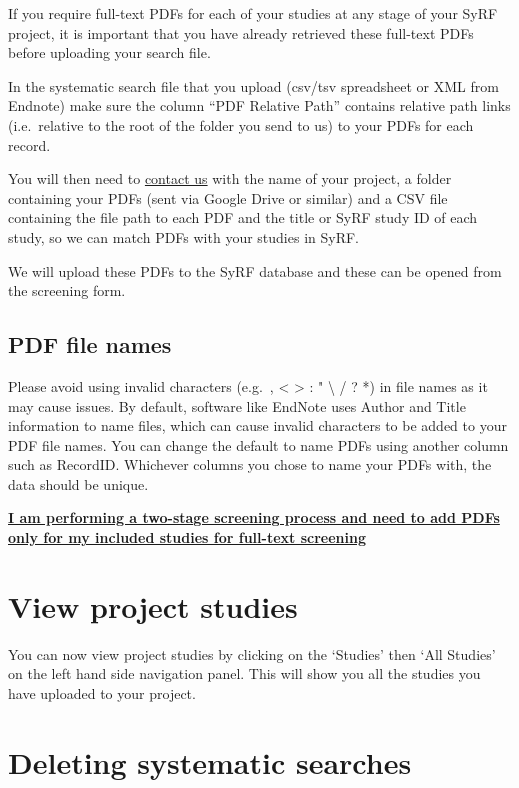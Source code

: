\documentclass[
]{book}
\begin{document}
If you require full-text PDFs for each of your studies at any stage of your SyRF project, it is important that you have already retrieved these full-text PDFs before uploading your search file.

In the systematic search file that you upload (csv/tsv spreadsheet or XML from Endnote) make sure the column ``PDF Relative Path'' contains relative path links (i.e.~relative to the root of the folder you send to us) to your PDFs for each record.

You will then need to \href{syrf.info@ed.ac.uk}{contact us} with the name of your project, a folder containing your PDFs (sent via Google Drive or similar) and a CSV file containing the file path to each PDF and the title or SyRF study ID of each study, so we can match PDFs with your studies in SyRF.

We will upload these PDFs to the SyRF database and these can be opened from the screening form.

\hypertarget{pdf-file-names}{%
\subsection{PDF file names}\label{pdf-file-names}}

Please avoid using invalid characters (e.g.~, \textless{} \textgreater{} : " \textbackslash{} / \textbar{} ? *) in file names as it may cause issues. By default, software like EndNote uses Author and Title information to name files, which can cause invalid characters to be added to your PDF file names. You can change the default to name PDFs using another column such as RecordID. Whichever columns you chose to name your PDFs with, the data should be unique.

\href{https://syrf.org.uk/faq}{\textbf{I am performing a two-stage screening process and need to add PDFs only for my included studies for full-text screening}}

\hypertarget{view-project-studies}{%
\section{View project studies}\label{view-project-studies}}

You can now view project studies by clicking on the `Studies' then `All Studies' on the left hand side navigation panel. This will show you all the studies you have uploaded to your project.

\hypertarget{deleting-systematic-searches}{%
\section{Deleting systematic searches}\label{deleting-systematic-searches}}
\end{document}
